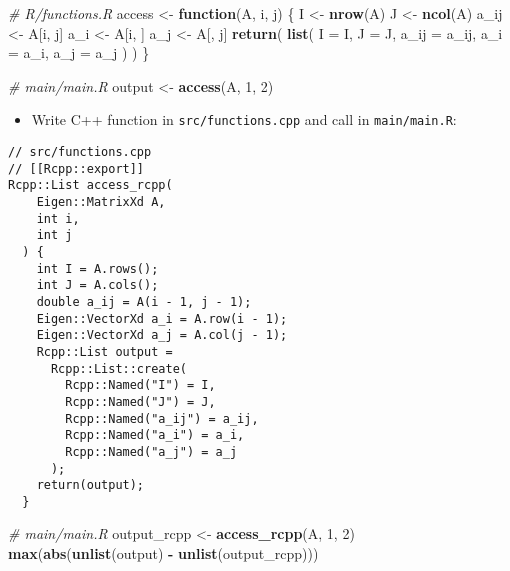 \documentclass[
]{book}
\newenvironment{Shaded}{\begin{snugshade}}{\end{snugshade}}
\newcommand{\AttributeTok}[1]{\textcolor[rgb]{0.13,0.29,0.53}{#1}}
\newcommand{\CommentTok}[1]{\textcolor[rgb]{0.56,0.35,0.01}{\textit{#1}}}
\newcommand{\ControlFlowTok}[1]{\textcolor[rgb]{0.13,0.29,0.53}{\textbf{#1}}}
\newcommand{\DecValTok}[1]{\textcolor[rgb]{0.00,0.00,0.81}{#1}}
\newcommand{\FunctionTok}[1]{\textcolor[rgb]{0.13,0.29,0.53}{\textbf{#1}}}
\newcommand{\NormalTok}[1]{#1}
\newcommand{\OtherTok}[1]{\textcolor[rgb]{0.56,0.35,0.01}{#1}}
\newcommand{\SpecialCharTok}[1]{\textcolor[rgb]{0.81,0.36,0.00}{\textbf{#1}}}
\providecommand{\tightlist}{%
  \setlength{\itemsep}{0pt}\setlength{\parskip}{0pt}}
\begin{document}
\begin{Shaded}
\begin{Highlighting}[]
\CommentTok{\# R/functions.R}
\NormalTok{access }\OtherTok{\textless{}{-}} 
  \ControlFlowTok{function}\NormalTok{(A, i, j) \{}
\NormalTok{    I }\OtherTok{\textless{}{-}} \FunctionTok{nrow}\NormalTok{(A)}
\NormalTok{    J }\OtherTok{\textless{}{-}} \FunctionTok{ncol}\NormalTok{(A)}
\NormalTok{    a\_ij }\OtherTok{\textless{}{-}}\NormalTok{ A[i, j]}
\NormalTok{    a\_i }\OtherTok{\textless{}{-}}\NormalTok{ A[i, ]}
\NormalTok{    a\_j }\OtherTok{\textless{}{-}}\NormalTok{ A[, j]}
    \FunctionTok{return}\NormalTok{(}
      \FunctionTok{list}\NormalTok{(}
        \AttributeTok{I =}\NormalTok{ I,}
        \AttributeTok{J =}\NormalTok{ J,}
        \AttributeTok{a\_ij =}\NormalTok{ a\_ij,}
        \AttributeTok{a\_i =}\NormalTok{ a\_i,}
        \AttributeTok{a\_j =}\NormalTok{ a\_j}
\NormalTok{      )}
\NormalTok{    )}
\NormalTok{  \}}
\end{Highlighting}
\end{Shaded}

\begin{Shaded}
\begin{Highlighting}[]
\CommentTok{\# main/main.R}
\NormalTok{output }\OtherTok{\textless{}{-}} \FunctionTok{access}\NormalTok{(A, }\DecValTok{1}\NormalTok{, }\DecValTok{2}\NormalTok{)}
\end{Highlighting}
\end{Shaded}

\begin{itemize}
\tightlist
\item
  Write C++ function in \texttt{src/functions.cpp} and call in \texttt{main/main.R}:
\end{itemize}

\begin{verbatim}
// src/functions.cpp
// [[Rcpp::export]]
Rcpp::List access_rcpp(
    Eigen::MatrixXd A, 
    int i, 
    int j
  ) {
    int I = A.rows();
    int J = A.cols();
    double a_ij = A(i - 1, j - 1);
    Eigen::VectorXd a_i = A.row(i - 1);
    Eigen::VectorXd a_j = A.col(j - 1);
    Rcpp::List output =
      Rcpp::List::create(
        Rcpp::Named("I") = I,
        Rcpp::Named("J") = J,
        Rcpp::Named("a_ij") = a_ij,
        Rcpp::Named("a_i") = a_i,
        Rcpp::Named("a_j") = a_j
      );
    return(output);
  }
\end{verbatim}

\begin{Shaded}
\begin{Highlighting}[]
\CommentTok{\# main/main.R}
\NormalTok{output\_rcpp }\OtherTok{\textless{}{-}} \FunctionTok{access\_rcpp}\NormalTok{(A, }\DecValTok{1}\NormalTok{, }\DecValTok{2}\NormalTok{)}
\FunctionTok{max}\NormalTok{(}\FunctionTok{abs}\NormalTok{(}\FunctionTok{unlist}\NormalTok{(output) }\SpecialCharTok{{-}} \FunctionTok{unlist}\NormalTok{(output\_rcpp)))}
\end{Highlighting}
\end{Shaded}
\end{document}
